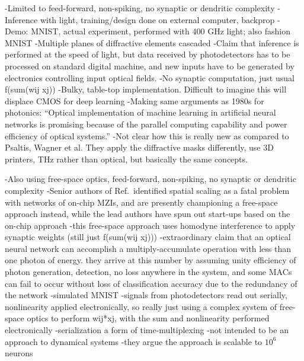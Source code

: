 \vspace{3em}
\cite{liri2018}
-Limited to feed-forward, non-spiking, no synaptic or dendritic complexity
-Inference with light, training/design done on external computer, backprop
-Demo: MNIST, actual experiment, performed with 400 GHz light; also fashion MNIST
-Multiple planes of diffractive elements cascaded
-Claim that inference is performed at the speed of light, but data received by photodetectors has to be processed on standard digital machine, and new inputs have to be generated by electronics controlling input optical fields.
-No synaptic computation, just usual f(sum(wij xj))
-Bulky, table-top implementation. Difficult to imagine this will displace CMOS for deep learning
-Making same arguments as 1980s for photonics: ``Optical implementation of machine learning in artificial neural networks is promising because of the parallel computing capability and power efficiency of optical systems.''
-Not clear how this is really new as compared to Psaltis, Wagner et al. They apply the diffractive masks differently, use 3D printers, THz rather than optical, but basically the same concepts.

\cite{hasl2018}
-Also using free-space optics, feed-forward, non-spiking, no synaptic or dendritic complexity
-Senior authors of Ref.\,\cite{shha2016} identified spatial scaling as a fatal problem with networks of on-chip MZIs, and are presently championing a free-space approach instead, while the lead authors have spun out start-ups based on the on-chip approach
-this free-space approach uses homodyne interference to apply synaptic weights (still just f(sum(wij xj)))
-extraordinary claim that an optical neural network can accomplish a multiply-accumulate operation with less than one photon of energy. they arrive at this number by assuming unity efficiency of photon generation, detection, no loss anywhere in the system, and some MACs can fail to occur without loss of classification accuracy due to the redundancy of the network
-simulated MNIST
-signals from photodetectors read out serially, nonlinearity applied electronically, so really just using a complex system of free-space optics to perform wij*xj, with the sum and nonlinearity performed electronically
-serialization a form of time-multiplexing
-not intended to be an approach to dynamical systems
-they argue the approach is scalable to $10^6$ neurons

